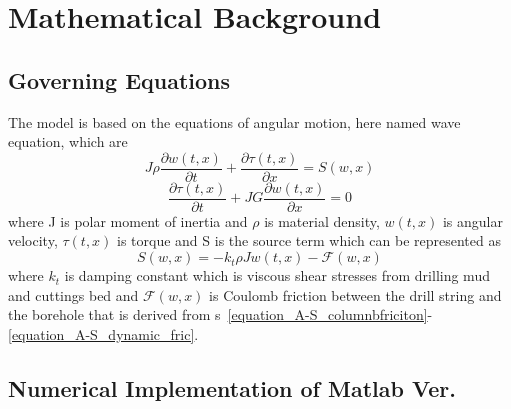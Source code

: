 \section{Mathematical Background}\label{SubSec_AS_mathematicalbackground}
\label{AS_Math}
\subsection{Governing Equations}
The model is based on the equations of angular motion, here named wave equation, which are
\begin{equation}\label{AS-motion}
  J\rho\frac{\partial w(t,x)}{\partial t} + \frac{\partial \tau (t,x)}{\partial x} = S(w,x)
\end{equation}
\begin{equation}\label{AS-motion1}
 \frac{\partial\tau(t,x)}{\partial t} + JG\frac{\partial w(t,x)}{\partial x} = 0
\end{equation}
where J is polar moment of inertia and $\rho$ is material density, $w(t,x)$ is angular velocity, $\tau(t,x)$ is torque and S is the source term which can be represented as
\begin{equation}\label{AS-sourceterm}
  S(w,x) = -k_t \rho J w(t,x) - \mathcal{F}(w,x)
\end{equation}
where $k_t$ is damping constant which is viscous shear stresses from drilling mud and cuttings bed and $\mathcal{F}(w,x)$ is Coulomb friction between the drill string and the borehole that is derived from \equationname{}s~\ref{equation_A-S_columnbfriciton}-\ref{equation_A-S_dynamic_fric}.

\subsection{Numerical Implementation of Matlab Ver.}
